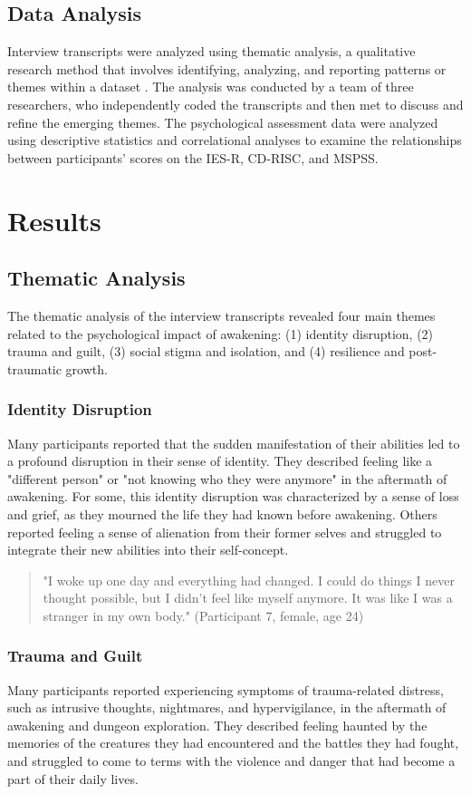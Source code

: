 \documentclass[12pt, a4paper]{article}
\begin{document}
\subsection{Data Analysis}
Interview transcripts were analyzed using thematic analysis, a qualitative research method that involves identifying, analyzing, and reporting patterns or themes within a dataset \citep{Braun2006}. The analysis was conducted by a team of three researchers, who independently coded the transcripts and then met to discuss and refine the emerging themes. The psychological assessment data were analyzed using descriptive statistics and correlational analyses to examine the relationships between participants' scores on the IES-R, CD-RISC, and MSPSS.

\section{Results}
\subsection{Thematic Analysis}
The thematic analysis of the interview transcripts revealed four main themes related to the psychological impact of awakening: (1) identity disruption, (2) trauma and guilt, (3) social stigma and isolation, and (4) resilience and post-traumatic growth.

\subsubsection{Identity Disruption}
Many participants reported that the sudden manifestation of their abilities led to a profound disruption in their sense of identity. They described feeling like a "different person" or "not knowing who they were anymore" in the aftermath of awakening. For some, this identity disruption was characterized by a sense of loss and grief, as they mourned the life they had known before awakening. Others reported feeling a sense of alienation from their former selves and struggled to integrate their new abilities into their self-concept.

\begin{quote}
    "I woke up one day and everything had changed. I could do things I never thought possible, but I didn't feel like myself anymore. It was like I was a stranger in my own body." (Participant 7, female, age 24)
\end{quote}

\subsubsection{Trauma and Guilt}
Many participants reported experiencing symptoms of trauma-related distress, such as intrusive thoughts, nightmares, and hypervigilance, in the aftermath of awakening and dungeon exploration. They described feeling haunted by the memories of the creatures they had encountered and the battles they had fought, and struggled to come to terms with the violence and danger that had become a part of their daily lives.
\end{document}
